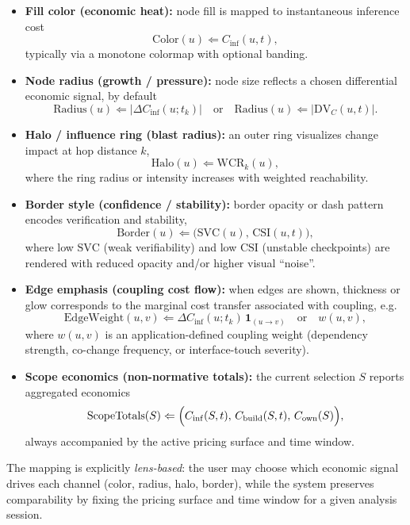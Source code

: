 \documentclass{aastex701}
\begin{document}
\begin{itemize}
\item \textbf{Fill color (economic heat):}
  node fill is mapped to instantaneous inference cost
  \begin{equation}
  \mathrm{Color}(u) \Leftarrow C_{\mathrm{inf}}(u,t),
  \end{equation}
  typically via a monotone colormap with optional banding.

\item \textbf{Node radius (growth / pressure):}
  node size reflects a chosen differential economic signal, by default
  \begin{equation}
  \mathrm{Radius}(u) \Leftarrow \left|\Delta C_{\mathrm{inf}}(u; t_k)\right|
  \quad\text{or}\quad
  \mathrm{Radius}(u) \Leftarrow \left|\mathrm{DV}_{C}(u,t)\right|.
  \end{equation}

\item \textbf{Halo / influence ring (blast radius):}
  an outer ring visualizes change impact at hop distance $k$,
  \begin{equation}
  \mathrm{Halo}(u) \Leftarrow \mathrm{WCR}_k(u),
  \end{equation}
  where the ring radius or intensity increases with weighted reachability.

\item \textbf{Border style (confidence / stability):}
  border opacity or dash pattern encodes verification and stability,
  \begin{equation}
  \mathrm{Border}(u) \Leftarrow \bigl(\mathrm{SVC}(u),\,\mathrm{CSI}(u,t)\bigr),
  \end{equation}
  where low $\mathrm{SVC}$ (weak verifiability) and low $\mathrm{CSI}$ (unstable checkpoints)
  are rendered with reduced opacity and/or higher visual ``noise''.

\item \textbf{Edge emphasis (coupling cost flow):}
  when edges are shown, thickness or glow corresponds to the marginal
  cost transfer associated with coupling, e.g.
  \begin{equation}
  \mathrm{EdgeWeight}(u,v) \Leftarrow
  \Delta C_{\mathrm{inf}}(u; t_k)\,\mathbf{1}_{(u\rightarrow v)}
  \quad\text{or}\quad
  w(u,v),
  \end{equation}
  where $w(u,v)$ is an application-defined coupling weight (dependency strength,
  co-change frequency, or interface-touch severity).

\item \textbf{Scope economics (non-normative totals):}
  the current selection $S$ reports aggregated economics
  \begin{equation}
  \mathrm{ScopeTotals}(S) \Leftarrow
  \Bigl(C_{\mathrm{inf}}(S,t),\, C_{\mathrm{build}}(S,t),\, C_{\mathrm{own}}(S)\Bigr),
  \end{equation}
  always accompanied by the active pricing surface and time window.
\end{itemize}

The mapping is explicitly \emph{lens-based}: the user may choose which economic signal drives each channel (color, radius, halo, border), while the system
preserves comparability by fixing the pricing surface and time window for a
given analysis session.
\end{document}
